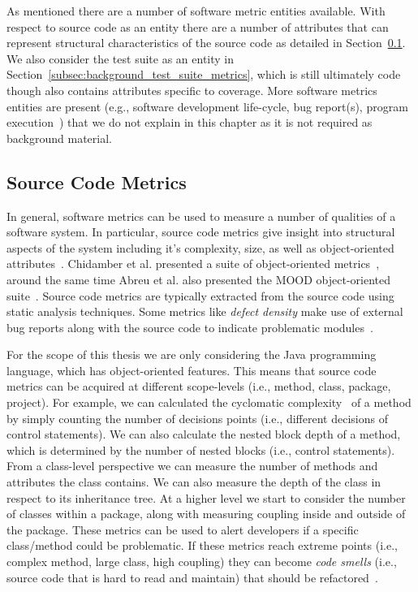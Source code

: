 As mentioned there are a number of software metric entities available. With respect to source code as an entity there are a number of attributes that can represent structural characteristics of the source code as detailed in Section~\ref{subsec:background_source_code_metrics}. We also consider the test suite as an entity in Section~\ref{subsec:background_test_suite_metrics}, which is still ultimately code though also contains attributes specific to coverage. More software metrics entities are present (e.g., software development life-cycle, bug report(s), program execution~\cite{SS08}) that we do not explain in this chapter as it is not required as background material.


\subsection{Source Code Metrics}
\label{subsec:background_source_code_metrics}
In general, software metrics can be used to measure a number of qualities of a software system. In particular, source code metrics give insight into structural aspects of the system including it's complexity, size, as well as object-oriented attributes~\cite{McCa76, Kan02, HWY09, Hend95, SRD12}. Chidamber et al. presented a suite of object-oriented metrics~\cite{CK94}, around the same time Abreu et al. also presented the MOOD object-oriented suite~\cite{AC94}. Source code metrics are typically extracted from the source code using static analysis techniques. Some metrics like \emph{defect density} make use of external bug reports along with the source code to indicate problematic modules~\cite{FP98}. 

For the scope of this thesis we are only considering the Java programming language, which has object-oriented features. This means that source code metrics can be acquired at different scope-levels (i.e., method, class, package, project). For example, we can calculated the cyclomatic complexity~\cite{McCa76} of a method by simply counting the number of decisions points (i.e., different decisions of control statements). We can also calculate the nested block depth of a method, which is determined by the number of nested blocks (i.e., control statements). From a class-level perspective we can measure the number of methods and attributes the class contains. We can also measure the depth of the class in respect to its inheritance tree. At a higher level we start to consider the number of classes within a package, along with measuring coupling inside and outside of the package. These metrics can be used to alert developers if a specific class/method could be problematic. If these metrics reach extreme points (i.e., complex method, large class, high coupling) they can become \emph{code smells} (i.e., source code that is hard to read and maintain) that should be refactored~\cite{FB99}.


